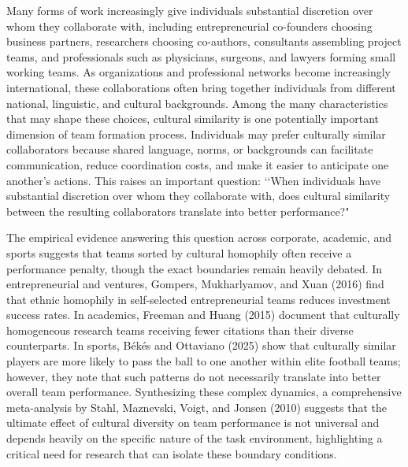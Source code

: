 \documentclass[10pt]{article}
\begin{document}
Many forms of work increasingly give individuals substantial discretion over whom they collaborate with, including entrepreneurial co-founders choosing business partners, researchers choosing co-authors, consultants assembling project teams, and professionals such as physicians, surgeons, and lawyers forming small working teams. %
As organizations and professional networks become increasingly international, these collaborations often bring together individuals from different national, linguistic, and cultural backgrounds. Among the many characteristics that may shape these choices, cultural similarity is one potentially important dimension of team formation process. Individuals may prefer culturally similar collaborators because shared language, norms, or backgrounds can facilitate communication, reduce coordination costs, and make it easier to anticipate one another's actions. %
This raises an important question: \lq\lq When individuals have substantial discretion over whom they collaborate with,  does cultural similarity between the resulting collaborators translate into better performance?" 

The empirical evidence answering this question across corporate, academic, and sports suggests that teams sorted by cultural homophily often receive a performance penalty, though the exact boundaries remain heavily debated. In entrepreneurial and ventures, Gompers, Mukharlyamov, and Xuan (2016) find that ethnic homophily in self-selected entrepreneurial teams reduces investment success rates. In academics, Freeman and Huang (2015) document  that culturally homogeneous research teams  receiving fewer citations than their diverse counterparts. In sports, Békés and Ottaviano (2025) show that culturally similar players are more likely to pass the ball to one another within elite football teams; however, they note that such patterns do not necessarily translate into better overall team performance. Synthesizing these complex dynamics, a comprehensive meta-analysis by Stahl, Maznevski, Voigt, and Jonsen (2010) suggests that the ultimate effect of cultural diversity on team performance is not universal and depends heavily on the specific nature of the task environment, highlighting a critical need for research that can isolate these boundary conditions.
\end{document}
